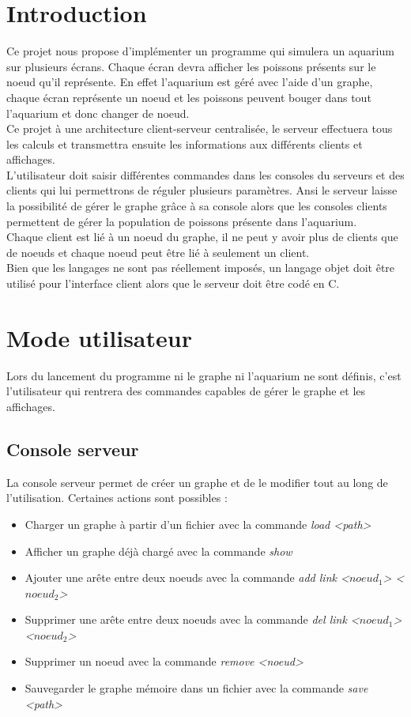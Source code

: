\section{Introduction}
Ce projet nous propose d'implémenter un programme qui simulera un aquarium sur plusieurs écrans. Chaque écran devra afficher les poissons présents sur le noeud qu'il représente. En effet l'aquarium est géré avec l'aide d'un graphe, chaque écran représente un noeud et les poissons peuvent bouger dans tout l'aquarium et donc changer de noeud. \\
Ce projet à une architecture client-serveur centralisée, le serveur effectuera tous les calculs et transmettra ensuite les informations aux différents clients et affichages.\\
L'utilisateur doit saisir différentes commandes dans les consoles du serveurs et des clients qui lui permettrons de réguler plusieurs paramètres.  Ansi le serveur laisse la possibilité de gérer le graphe grâce à sa console alors que les consoles clients permettent de gérer la population de poissons présente dans l'aquarium.\\
Chaque client est lié à un noeud du graphe, il ne peut y avoir plus de clients que de noeuds et chaque noeud peut être lié à seulement un client.\\
Bien que les langages ne sont pas réellement imposés, un langage objet doit être utilisé pour l'interface client alors que le serveur doit être codé en C.


\section{Mode utilisateur}
Lors du lancement du programme ni le graphe ni l'aquarium ne sont définis, c'est l'utilisateur qui rentrera des commandes capables de gérer le graphe et les affichages.
\subsection{Console serveur}
\label{sec:console}
La console serveur permet de créer un graphe et de le modifier tout au long de l'utilisation. Certaines actions sont possibles :
\begin{itemize}
\item Charger un graphe à partir d'un fichier avec la commande \textit{load <path>}
\item Afficher un graphe déjà chargé avec la commande \textit{show}
\item Ajouter une arête entre deux noeuds avec la commande \textit{add link <$noeud_1$> <$noeud_2$>}
\item Supprimer une arête entre deux noeuds avec la commande \textit{del link <$noeud_1$> <$noeud_2$>}
\item Supprimer un noeud avec la commande \textit{remove <noeud>}
\item Sauvegarder le graphe mémoire dans un fichier avec la commande \textit{save <path>}
\end{itemize}

